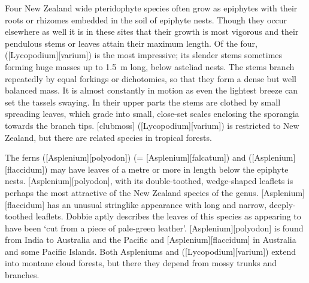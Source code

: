 Four New Zealand wide pteridophyte species often grow as epiphytes with their roots or rhizomes embedded in the soil of epiphyte nests.
Though they occur elsewhere as well it is in these sites that their growth is most vigorous and their pendulous stems or leaves attain their maximum length.
Of the four,  ([Lycopodium][varium]) is the most impressive; its slender stems sometimes forming huge masses up to \SI{1.5}{\metre} long, below asteliad nests.
The stems branch repeatedly by equal forkings or dichotomies, so that they form a dense but well balanced mass.
It is almost constantly in motion as even the lightest breeze can set the tassels swaying.
In their upper parts the stems are clothed by small spreading leaves, which grade into small, close-set scales enclosing the sporangia towards the branch tips.
[clubmoss] ([Lycopodium][varium]) is restricted to New Zealand, but there are related species in tropical forests.

The ferns  ([Asplenium][polyodon]) (= [Asplenium][falcatum]) and  ([Asplenium][flaccidum]) may have leaves of a metre or more in length below the epiphyte nests.
[Asplenium][polyodon], with its double-toothed, wedge-shaped leaflets is perhaps the most attractive of the New Zealand species of the genus.
[Asplenium][flaccidum] has an unusual stringlike appearance with long and narrow, deeply-toothed leaflets.
Dobbie aptly describes the leaves of this species as appearing to have been `cut from a piece of pale-green leather'. [Asplenium][polyodon] is found from India to Australia and the Pacific and [Asplenium][flaccidum] in Australia and some Pacific Islands.
Both Aspleniums and  ([Lycopodium][varium]) extend into montane cloud forests, but there they depend from mossy trunks and branches.

